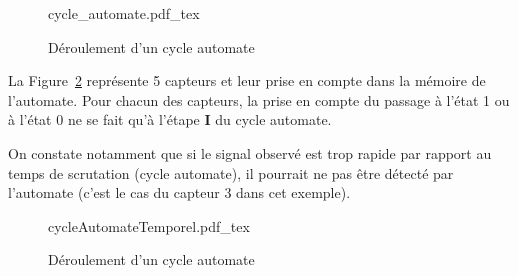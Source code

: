 \begin{figure}[h!t]
  \centering
  \def\svgwidth{.4\textwidth}
  {cycle_automate.pdf_tex}
  \caption{Déroulement d'un cycle automate}
  \label{fig:cycleAutomate}
\end{figure}

La Figure~\ref{fig:cycleAutomateCapteurToEntree} représente 5 capteurs et leur prise en compte dans la mémoire de l'automate. Pour chacun des capteurs, la prise en compte du passage à l'état 1 ou à l'état 0 ne se fait qu'à l'étape \textbf{I} du cycle automate.

On constate notamment que si le signal observé est trop rapide par rapport au temps de scrutation (cycle automate), il pourrait ne pas être détecté par l'automate (c'est le cas du capteur 3 dans cet exemple).






\begin{UPSTIactivite}
\end{UPSTIactivite}

\begin{figure}[p]
  \centering
  \def\svgwidth{.9\textwidth}
  {cycleAutomateTemporel.pdf_tex}
  \caption{Déroulement d'un cycle automate}
  \label{fig:cycleAutomateCapteurToEntree}
\end{figure}
